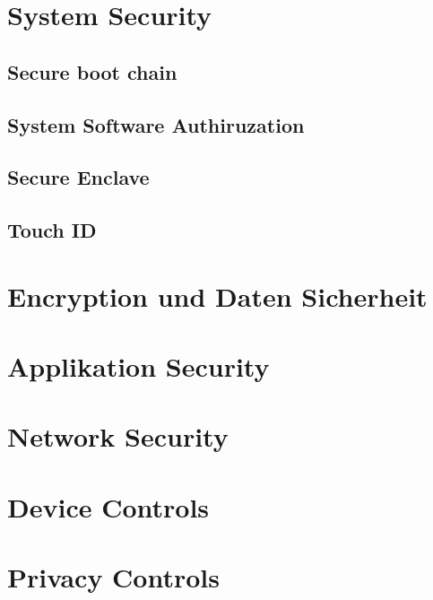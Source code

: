\section{System Security}
\label{sec:SystemSec}

\subsection{Secure boot chain}
\label{subsec:SystemBootChain}

\subsection{System Software Authiruzation}
\label{subsec:SystemSWAuth}

\subsection{Secure Enclave}
\label{subsec:SystemSecEnclave}

\subsection{Touch ID}
\label{subsec:SystemTouchID}

\section{Encryption und Daten Sicherheit}
\label{sec:DataEnc}

\section{Applikation Security}
\label{sec:AppSec}

\section{Network Security}
\label{sec:NetworkSec}

\section{Device Controls}
\label{sec:DeviceControl}

\section{Privacy Controls}
\label{sec:}



